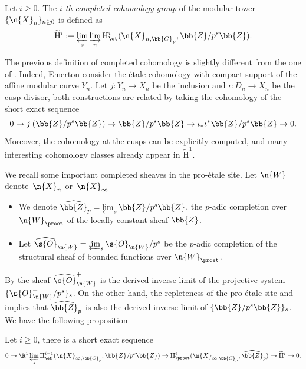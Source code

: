 \begin{definition}
Let $i\geq 0$. The \textit{$i$-th completed cohomology group} of the modular tower $\{\n{X}_n\}_{n\geq 0}$ is defined as\vspace*{-3pt}
\[
\widetilde{\mathrm{H}}^i:= \varprojlim_{s} \varinjlim_{n} \mathrm{H}_{\et}^i(\n{X}_{n,\bb{C}_p}, \bb{Z}/p^s \bb{Z}).
\]
\end{definition}
\begin{remark}
The previous definition of completed cohomology is slightly different from the one of \cite{MR2207783}. Indeed, Emerton consider the étale cohomology with compact support of the affine modular curve $Y_n$. Let $j: Y_n\to X_n$ be the inclusion and $\iota: D_n\to X_n$ be the cusp divisor, both constructions are related by taking the cohomology of the short exact sequence\vspace*{-3pt}
\[
0 \to j_!(\bb{Z}/p^s \bb{Z}) \to \bb{Z}/p^s \bb{Z} \to \iota_* \iota^* \bb{Z}/p^s \bb{Z}\to 0.
\]
Moreover, the cohomology at the cusps can be explicitly computed, and many interesting cohomology classes already appear in $\widetilde{\mathrm{H}}^1$.
\end{remark}

We recall some important completed sheaves in the pro-étale site. Let $\n{W}$ denote~$\n{X}_n$ or~$\n{X}_{\infty}$
\begin{itemize}
\item
We denote $\widehat{\bb{Z}}_p = \varprojlim_s \bb{Z}/p^s\bb{Z}$, the $p$-adic completion over $\n{W}_{\proet}$ of the locally constant sheaf $\bb{Z}$.

\item
Let $\widehat{\s{O}}^+_{\n{W}}= \varprojlim_{s} \s{O}_{\n{W}}^+/p^s$ be the $p$-adic completion of the structural sheaf of bounded functions over $\n{W}_{\proet}$.
\end{itemize}
By \cite[Lem.\,3.18]{MR3090230} the sheaf $\widehat{\s{O}}_{\n{W}}^+$ is the derived inverse limit of the projective system $\{\s{O}_{\n{W}}^+/p^s\}_s$. On the other hand, the repleteness of the pro-étale site and \cite[Prop.\,3.1.10]{bhatt2014proetale} implies that $\widehat{\bb{Z}}_p$ is also the derived inverse limit of $\{\bb{Z}/p^s\bb{Z}\}_{s}$. We have the following proposition

\begin{prop}
\label{PropCompletedCohAndPerf}
Let $i\geq 0$, there is a short exact sequence
\[
0\to \R^1 \varprojlim_s \mathrm{H}^{i-1}_{\et}(\n{X}_{\infty, \bb{C}_p}, \bb{Z}/p^s \bb{Z}) \to \mathrm{H}^i_{\proet}(\n{X}_{\infty, \bb{C}_p}, \widehat{\bb{Z}}_p) \to \widetilde{\mathrm{H}}^i\to 0.
\]
\end{prop}

